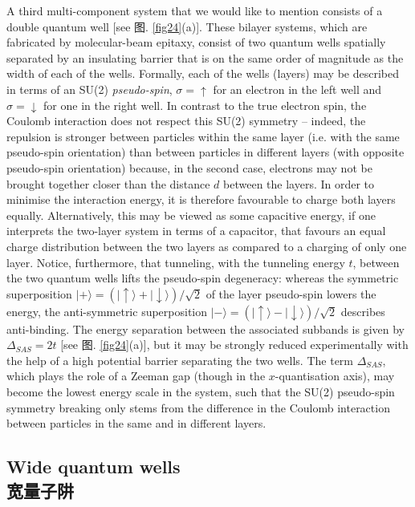\documentclass[10pt]{book}
\newcommand{\ua}{\uparrow}
\newcommand{\da}{\downarrow}
\begin{document}
A third multi-component system that we would like to mention consists of a double quantum well [see 图. \ref{fig24}(a)]. 
These bilayer systems, which are fabricated by molecular-beam epitaxy, consist of two quantum wells spatially separated 
by an insulating barrier that is on the same order of magnitude as the width of each of the wells. Formally, each
of the wells (layers) may be described in terms of an SU(2) {\sl pseudo-spin}, $\sigma=\ua$ for an electron in the left well 
and $\sigma=\da$ for one in the right well. In contrast to the true electron spin, the Coulomb interaction does not respect
this SU(2) symmetry -- indeed, the repulsion is stronger between particles within the same layer (i.e. with the
same pseudo-spin orientation) than between particles in different layers (with opposite pseudo-spin orientation) because, in
the second case, electrons may not be brought together closer than the distance $d$ between the layers. In order to minimise
the interaction energy, it is therefore favourable to charge both layers equally. Alternatively,
this may be viewed as some capacitive energy, if one interprets the two-layer system in terms of a capacitor,
that favours an equal charge distribution between the two layers as compared to a charging of only one layer. Notice, furthermore,
that tunneling, with the tunneling energy $t$,
between the two quantum wells lifts the pseudo-spin degeneracy: whereas the symmetric superposition
$|+\rangle=(|\ua\rangle +|\da\rangle)/\sqrt{2}$ of the layer pseudo-spin lowers the energy, the anti-symmetric superposition
$|-\rangle=(|\ua\rangle -|\da\rangle)/\sqrt{2}$ describes anti-binding. The energy separation between the associated subbands
is given by $\Delta_{SAS}=2t$ [see 图. \ref{fig24}(a)], but it may be strongly reduced experimentally with the help of 
a high potential barrier separating the two wells. The term $\Delta_{SAS}$, which plays the role of a Zeeman gap (though in the 
$x$-quantisation axis), may become the lowest energy scale in the system, such that the SU(2) pseudo-spin symmetry breaking
only stems from the difference in the Coulomb interaction between particles in the same and in different layers.

{\subsection[宽量子阱]{Wide quantum wells\\\bf 宽量子阱}}
\end{document}
